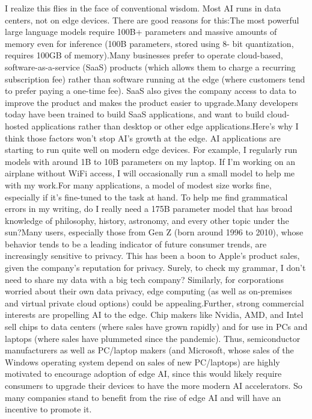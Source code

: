\documentclass[withindex,glossary]{cam-thesis}
\begin{document}
I realize this flies in the face of conventional wisdom. Most AI runs in data centers, not on edge devices. There are good reasons for this:The most powerful large language models require 100B+ parameters and massive amounts of memory even for inference (100B parameters, stored using 8- bit quantization, requires 100GB of memory).Many businesses prefer to operate cloud-based, software-as-a-service (SaaS) products (which allows them to charge a recurring subscription fee) rather than software running at the edge (where customers tend to prefer paying a one-time fee). SaaS also gives the company access to data to improve the product and makes the product easier to upgrade.Many developers today have been trained to build SaaS applications, and want to build cloud-hosted applications rather than desktop or other edge applications.Here’s why I think those factors won’t stop AI’s growth at the edge. AI applications are starting to run quite well on modern edge devices. For example, I regularly run models with around 1B to 10B parameters on my laptop. If I’m working on an airplane without WiFi access, I will occasionally run a small model to help me with my work.For many applications, a model of modest size works fine, especially if it’s fine-tuned to the task at hand. To help me find grammatical errors in my writing, do I really need a 175B parameter model that has broad knowledge of philosophy, history, astronomy, and every other topic under the sun?Many users, especially those from Gen Z (born around 1996 to 2010), whose behavior tends to be a leading indicator of future consumer trends, are increasingly sensitive to privacy. This has been a boon to Apple’s product sales, given the company’s reputation for privacy. Surely, to check my grammar, I don’t need to share my data with a big tech company? Similarly, for corporations worried about their own data privacy, edge computing (as well as on-premises and virtual private cloud options) could be appealing.Further, strong commercial interests are propelling AI to the edge. Chip makers like Nvidia, AMD, and Intel sell chips to data centers (where sales have grown rapidly) and for use in PCs and laptops (where sales have plummeted since the pandemic). Thus, semiconductor manufacturers as well as PC/laptop makers (and Microsoft, whose sales of the Windows operating system depend on sales of new PC/laptops) are highly motivated to encourage adoption of edge AI, since this would likely require consumers to upgrade their devices to have the more modern AI accelerators. So many companies stand to benefit from the rise of edge AI and will have an incentive to promote it.
\end{document}
